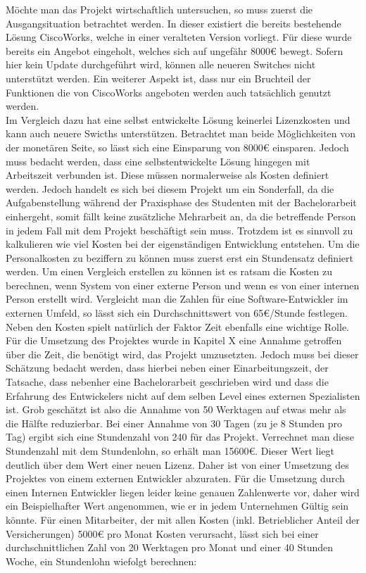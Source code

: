 Möchte man das Projekt wirtschaftlich untersuchen, so muss zuerst die Ausgangsituation betrachtet werden. In dieser existiert die bereits bestehende Lösung CiscoWorks, welche in einer veralteten Version vorliegt. Für diese wurde bereits ein Angebot eingeholt, welches sich auf ungefähr 8000€ bewegt. Sofern hier kein Update durchgeführt wird, können alle neueren Switches nicht unterstützt werden. Ein weiterer Aspekt ist, dass nur ein Bruchteil der Funktionen die von CiscoWorks angeboten werden auch tatsächlich genutzt werden.\\
Im Vergleich dazu hat eine selbst entwickelte Lösung keinerlei Lizenzkosten und kann auch neuere Swicths unterstützen. Betrachtet man beide Möglichkeiten von der monetären Seite, so lässt sich eine Einsparung von 8000€ einsparen. Jedoch muss bedacht werden, dass eine selbstentwickelte Lösung hingegen mit Arbeitszeit  verbunden ist.  Diese müssen normalerweise als Kosten definiert werden. Jedoch handelt es sich bei diesem Projekt um ein Sonderfall, da die Aufgabenstellung während der Praxisphase des Studenten mit der Bachelorarbeit einhergeht, somit fällt keine zusätzliche Mehrarbeit an, da die betreffende Person in jedem Fall mit dem Projekt beschäftigt sein muss. Trotzdem ist es sinnvoll zu kalkulieren wie viel Kosten bei der eigenständigen Entwicklung entstehen.
Um die Personalkosten zu beziffern zu können muss zuerst erst ein Stundensatz definiert werden. Um einen Vergleich erstellen zu können ist es ratsam die Kosten zu berechnen, wenn System von einer externe Person und wenn es von einer internen Person erstellt wird.
Vergleicht man die Zahlen für eine Software-Entwickler im externen Umfeld, so lässt sich ein Durchschnittswert von 65€/Stunde festlegen. Neben den Kosten spielt natürlich der Faktor Zeit ebenfalls eine wichtige Rolle. Für die Umsetzung des Projektes wurde in Kapitel X eine Annahme getroffen über die Zeit, die benötigt wird, das Projekt umzusetzten. Jedoch muss bei dieser Schätzung bedacht werden, dass hierbei neben einer Einarbeitungszeit, der Tatsache, dass nebenher eine Bachelorarbeit geschrieben wird und dass die Erfahrung des Entwickelers nicht auf dem selben Level eines externen Spezialisten ist. Grob geschätzt ist also die Annahme von 50 Werktagen auf etwas mehr als die Hälfte reduzierbar. Bei einer Annahme von 30 Tagen (zu je 8 Stunden pro Tag) ergibt sich eine Stundenzahl von 240 für das Projekt.
Verrechnet man diese Stundenzahl mit dem Stundenlohn, so erhält man 15600€. Dieser Wert liegt deutlich über dem Wert einer neuen Lizenz. Daher ist von einer Umsetzung des Projektes von einem externen Entwickler abzuraten. Für die Umsetzung durch einen Internen Entwickler liegen leider keine genauen Zahlenwerte vor, daher wird ein Beispielhafter Wert angenommen, wie er in jedem Unternehmen Gültig sein könnte. Für einen Mitarbeiter, der mit allen Kosten (inkl. Betrieblicher Anteil der Versicherungen) 5000€ pro Monat Kosten verursacht, lässt sich bei einer durchschnittlichen Zahl von 20 Werktagen pro Monat und einer 40 Stunden Woche, ein Stundenlohn wiefolgt berechnen:\\
